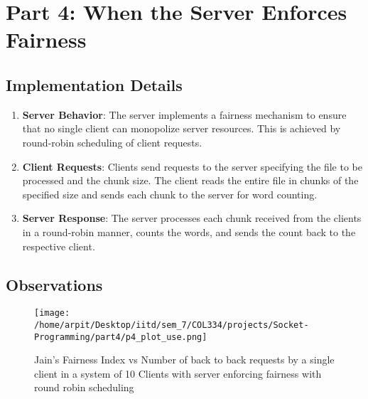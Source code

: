 \documentclass[12pt]{article}
\begin{document}
\section{Part 4: When the Server Enforces Fairness}

\subsection{Implementation Details}
\begin{enumerate}
    \item \textbf{Server Behavior}: The server implements a fairness mechanism to ensure that no single client can monopolize server resources. This is achieved by round-robin scheduling of client requests.
    \item \textbf{Client Requests}: Clients send requests to the server specifying the file to be processed and the chunk size. The client reads the entire file in chunks of the specified size and sends each chunk to the server for word counting.
    \item \textbf{Server Response}: The server processes each chunk received from the clients in a round-robin manner, counts the words, and sends the count back to the respective client.
\end{enumerate}

\subsection{Observations}

\begin{figure}[h!]
    \centering
    \texttt{[image: /home/arpit/Desktop/iitd/sem\_7/COL334/projects/Socket-Programming/part4/p4\_plot\_use.png]}
    \caption{Jain's Fairness Index vs Number of back to back requests by a single client in a system of 10 Clients with server enforcing fairness with round robin scheduling}
    \label{fig:part4_output}
\end{figure}
\end{document}
